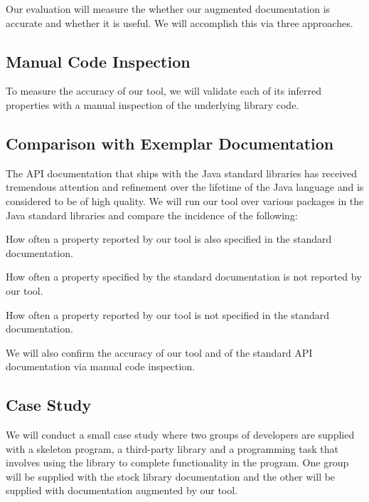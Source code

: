 \documentclass[letterpaper,12pt]{article}
\let\Itemize =\itemize
\def\Nospacing{\itemsep=0pt\topsep=0pt\partopsep=0pt\parskip=0pt\parsep=0pt}
\renewenvironment{itemize}{\Itemize\Nospacing}{\endlist}
\begin{document}
Our evaluation will measure the whether our augmented documentation is accurate
and whether it is useful. We will accomplish this via three approaches.

\subsection{Manual Code Inspection}

To measure the accuracy of our tool, we will validate each of its inferred
properties with a manual inspection of the underlying library code.

\subsection{Comparison with Exemplar Documentation}

The API documentation that ships with the Java standard libraries has received
tremendous attention and refinement over the lifetime of the Java language and
is considered to be of high quality. We will run our tool over various packages
in the Java standard libraries and compare the incidence of the following:

\begin{itemize}
\item How often a property reported by our tool is also specified in the
  standard documentation.

\item How often a property specified by the standard documentation is not
  reported by our tool.

\item How often a property reported by our tool is not specified in the
  standard documentation.
\end{itemize}

We will also confirm the accuracy of our tool and of the standard API
documentation via manual code inspection.

\subsection{Case Study}

We will conduct a small case study where two groups of developers are supplied
with a skeleton program, a third-party library and a programming task that
involves using the library to complete functionality in the program. One group
will be supplied with the stock library documentation and the other will be
supplied with documentation augmented by our tool.
\end{document}
